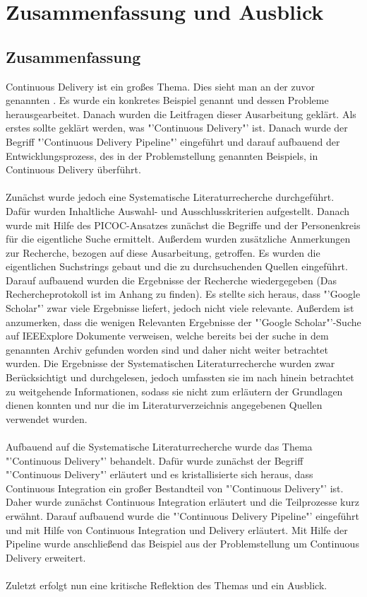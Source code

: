 \chapter{Zusammenfassung und Ausblick}
\label{chap:zusammenfassungUndAusblick}

\section{Zusammenfassung}
\label{sec:zusammenfassung}
Continuous Delivery ist ein großes Thema. Dies sieht man an der zuvor genannten . Es wurde ein konkretes Beispiel genannt und dessen Probleme herausgearbeitet. Danach wurden die Leitfragen dieser Ausarbeitung geklärt. Als erstes sollte geklärt werden, was "'Continuous Delivery"' ist. Danach wurde der Begriff "'Continuous Delivery Pipeline"' eingeführt und darauf aufbauend der Entwicklungsprozess, des in der Problemstellung genannten Beispiels, in Continuous Delivery überführt.
\\\\
Zunächst wurde jedoch eine Systematische Literaturrecherche durchgeführt. Dafür wurden Inhaltliche Auswahl- und Ausschlusskriterien aufgestellt. Danach wurde mit Hilfe des PICOC-Ansatzes zunächst die Begriffe und der Personenkreis für die eigentliche Suche ermittelt. Außerdem wurden zusätzliche Anmerkungen zur Recherche, bezogen auf diese Ausarbeitung,  getroffen. Es wurden die eigentlichen Suchstrings gebaut und die zu durchsuchenden Quellen eingeführt. Darauf aufbauend wurden die Ergebnisse der Recherche wiedergegeben (Das Rechercheprotokoll ist im Anhang zu finden). Es stellte sich heraus, dass "'Google Scholar"' zwar viele Ergebnisse liefert, jedoch nicht viele relevante. Außerdem ist anzumerken, dass die wenigen Relevanten Ergebnisse der "'Google Scholar"'-Suche auf IEEExplore Dokumente verweisen, welche bereits bei der suche in dem genannten Archiv gefunden worden sind und daher nicht weiter betrachtet wurden. Die Ergebnisse der Systematischen Literaturrecherche wurden zwar Berücksichtigt und durchgelesen, jedoch umfassten sie im nach hinein betrachtet zu weitgehende Informationen, sodass sie nicht zum erläutern der Grundlagen dienen konnten und nur die im Literaturverzeichnis angegebenen Quellen verwendet wurden.
\\\\
Aufbauend auf die Systematische Literaturrecherche wurde das Thema "'Continuous Delivery"' behandelt. Dafür wurde zunächst der Begriff "'Continuous Delivery"' erläutert und es kristallisierte sich heraus, dass Continuous Integration ein großer Bestandteil von "'Continuous Delivery"' ist. Daher wurde zunächst Continuous Integration erläutert und die Teilprozesse kurz erwähnt. Darauf aufbauend wurde die "'Continuous Delivery Pipeline"' eingeführt und mit Hilfe von Continuous Integration und Delivery erläutert. Mit Hilfe der Pipeline wurde anschließend das Beispiel aus der Problemstellung um Continuous Delivery erweitert.
\\\\
Zuletzt erfolgt nun eine kritische Reflektion des Themas und ein Ausblick.

